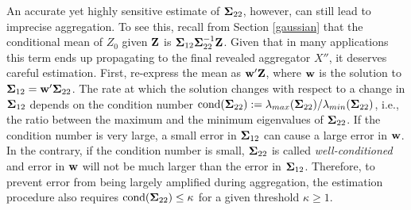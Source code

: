 \documentclass[11pt]{article}
\theoremstyle{definition}
\theoremstyle{definition}
\def\bSigma{{\bf \Sigma}}
\def\w{{\bf w}}
\def\Z{{\bf Z}}
\def\cond{\text{cond}}
\begin{document}
An accurate yet highly sensitive estimate of $\bSigma_{22}$, however, can still lead to imprecise aggregation. To see this, recall from Section \ref{gaussian} that the conditional mean of $Z_0$ given $\Z$ is  $\bSigma_{12} \bSigma_{22}^{-1} \Z$. Given that in many applications this term ends up propagating to the final revealed aggregator $X''$, it deserves careful estimation. 
 First, re-express the mean as $\w' \Z$, where $\w$ is the solution to $\bSigma_{12} = \w' \bSigma_{22}$. The rate at which the solution changes with respect to a change in $\bSigma_{12}$ depends on the condition number $\cond(\bSigma_{22}) := \lambda_{max}(\bSigma_{22}) / \lambda_{min}(\bSigma_{22})$, i.e., the ratio between the maximum and the minimum eigenvalues of $\bSigma_{22}$. If the condition number is very large, a small error in $\bSigma_{12}$ can cause a large error in $\w$. In the contrary, if the condition number is small, $\bSigma_{22}$ is called \textit{well-conditioned} and error in $\w$ will not be much larger than the error in $\bSigma_{12}$. Therefore, to prevent error from being largely amplified during aggregation, the estimation procedure also requires $\cond(\bSigma_{22}) \leq \kappa$ for a given threshold $\kappa \geq 1$. 
 
% 


\end{document}
